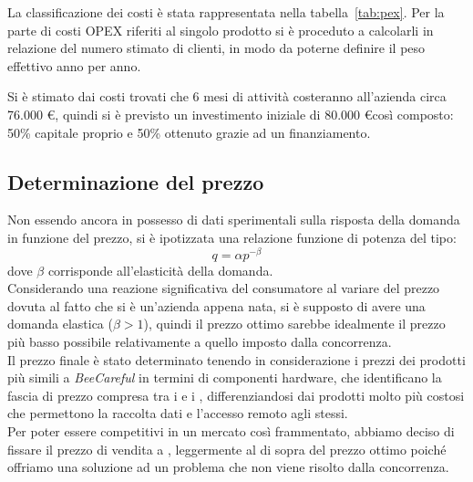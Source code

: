La classificazione dei costi è stata rappresentata nella tabella~\ref{tab:pex}.
Per la parte di costi OPEX riferiti al singolo prodotto si è proceduto a
calcolarli in relazione del numero stimato di clienti, in modo da poterne
definire il peso effettivo anno per anno.


Si è stimato dai costi trovati che 6 mesi di attività costeranno all’azienda
circa 76.000 \euro, quindi si è previsto un investimento iniziale di 80.000
\euro così composto: 50\% capitale proprio e 50\% ottenuto grazie ad un
finanziamento.
\subsection{Determinazione del prezzo}
Non essendo ancora in possesso di dati sperimentali sulla risposta della domanda
in funzione del prezzo, si è ipotizzata una relazione funzione di potenza del
tipo: 
\begin{displaymath}
q = \alpha p^{-\beta}
\end{displaymath}
dove $\beta$ corrisponde all’elasticità della domanda.\\
Considerando una reazione significativa del consumatore al variare del prezzo
dovuta al fatto che si è un’azienda appena nata, si è supposto di avere una domanda elastica ($\beta > 1$), quindi il prezzo ottimo sarebbe idealmente il prezzo più basso possibile relativamente a quello imposto dalla concorrenza.\\
Il prezzo finale è stato determinato tenendo in considerazione i prezzi dei prodotti più simili a \textit{BeeCareful} in termini di componenti hardware, che identificano la fascia di prezzo compresa tra i  e i , differenziandosi dai prodotti molto più costosi che permettono la raccolta dati e l’accesso remoto agli stessi.\\
Per poter essere competitivi in un mercato così frammentato, abbiamo deciso di fissare il prezzo di vendita a , leggermente al di sopra del prezzo ottimo poiché offriamo una soluzione ad un problema che non viene risolto dalla concorrenza.
